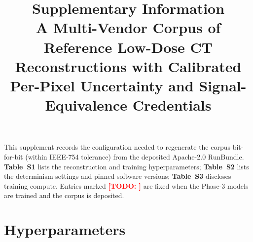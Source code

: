 \documentclass{article}
\title{\textbf{Supplementary Information}\\
A Multi-Vendor Corpus of Reference Low-Dose CT Reconstructions with
Calibrated Per-Pixel Uncertainty and Signal-Equivalence Credentials}
\author{}
\date{}
\newcommand{\todo}[1]{\textcolor{red}{\textbf{[TODO: #1]}}}
\begin{document}
\maketitle

\noindent
This supplement records the configuration needed to regenerate the corpus
bit-for-bit (within IEEE-754 tolerance) from the deposited Apache-2.0
RunBundle. \textbf{Table~S1} lists the reconstruction and training
hyperparameters; \textbf{Table~S2} lists the determinism settings and
pinned software versions; \textbf{Table~S3} discloses training compute.
Entries marked \todo{} are fixed when the Phase-3 models are trained and
the corpus is deposited.

\section{Hyperparameters}
\end{document}
